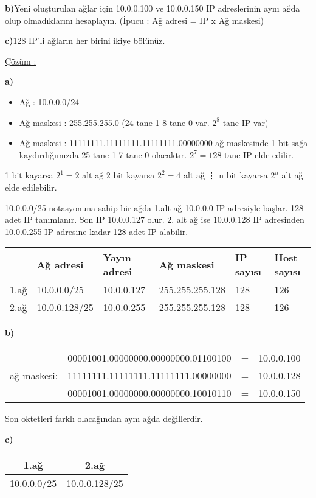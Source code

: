 \textbf{b)}Yeni oluşturulan ağlar için 10.0.0.100 ve 10.0.0.150 IP adreslerinin aynı ağda olup olmadıklarını hesaplayın. (İpucu : Ağ adresi = IP x Ağ maskesi)

\textbf{c)}128 IP'li ağların her birini ikiye bölünüz. 


\underline{Çözüm :}

\textbf{a)}
\begin{itemize}
\item[] Ağ : 10.0.0.0/24
\item[] Ağ maskesi : 255.255.255.0 (24 tane 1 8 tane 0 var. $2^8$ tane IP var)
\item[] Ağ maskesi : 11111111.11111111.11111111.00000000 ağ maskesinde 1 bit sağa kaydırdığımızda 25 tane 1 7 tane 0 olacaktır. $2^7=128$ tane IP elde edilir. 
\end{itemize} 

1 bit kayarsa $2^1=2$ alt ağ
2 bit kayarsa $2^2=4$ alt ağ
\vdots
n bit kayarsa $2^n$ alt ağ elde edilebilir. 

10.0.0.0/25 notasyonuna sahip bir ağda 1.alt ağ 10.0.0.0 IP adresiyle başlar. 128 adet IP tanımlanır. Son IP 10.0.0.127 olur. 2. alt ağ ise 10.0.0.128 IP adresinden 10.0.0.255 IP adresine kadar 128 adet IP alabilir. 


\begin{tabular}{l|l|l|l|l|l}
&Ağ adresi & Yayın adresi & Ağ maskesi & IP sayısı & Host sayısı\\
\hline
1.ağ & 10.0.0.0/25 & 10.0.0.127 & 255.255.255.128 & 128 &126 \\
\hline
2.ağ & 10.0.0.128/25 & 10.0.0.255 &255.255.255.128 & 128 & 126 \\

\end{tabular}


\textbf{b)}

\begin{tabular}{llll}
& 00001001.00000000.00000000.01100100 &=& 10.0.0.100\\
ağ maskesi:& 11111111.11111111.11111111.00000000 &=&10.0.0.128\\
\hline
&00001001.00000000.00000000.10010110 &=&10.0.0.150 \\

\end{tabular}

Son oktetleri farklı olacağından aynı ağda değillerdir. 

\textbf{c)} 

\begin{tabular}{cc}
1.ağ & 2.ağ \\
\hline
10.0.0.0/25 & 10.0.0.128/25 \\
\end{tabular}

